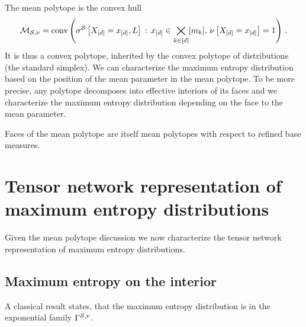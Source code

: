 \documentclass[aps,onecolumn,nofootinbib,pra]{article}
\begin{document}
%        


    The mean polytope is the convex hull
    \begin{align*}
        \mathcal{M}_{\mathcal{S},\nu}
        = \mathrm{conv}\left(\sigma^{\mathcal{S}}\left[X_{[d]}=x_{[d]},L\right]\,:\,x_{[d]}\in\bigtimes_{k\in[d]}[m_{k}],\,\nu\left[X_{[d]}=x_{[d]}\right]=1\right) \, .
    \end{align*}
    It is thus a convex polytope, inherited by the convex polytope of distributions (the standard simplex).
    We can characterize the maximum entropy distribution based on the position of the mean parameter in the mean polytope.
    To be more precise, any polytope decomposes into effective interiors of its faces and we characterize the maximum entropy distribution depending on the face to the mean parameter.

    Faces of the mean polytope are itself mean polytopes with respect to refined base measures.


    \section{Tensor network representation of maximum entropy distributions}

    Given the mean polytope discussion we now characterize the tensor network representation of maximum entropy distributions.

    \subsection{Maximum entropy on the interior}

    A classical result states, that the maximum entropy distribution is in the exponential family $\Gamma^{\mathcal{S},\nu}$.
\end{document}
